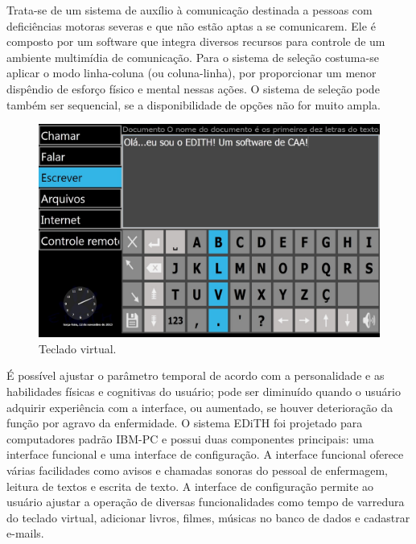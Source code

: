 \documentclass[twoside]{article}
\begin{document}
\begin{multicols}{2}
Trata-se de um sistema de auxílio à comunicação destinada a pessoas com deficiências motoras severas e que não estão aptas a se comunicarem. Ele é composto por um software que integra diversos recursos para controle de um ambiente multimídia de comunicação. Para o sistema de seleção costuma-se aplicar o modo linha-coluna (ou coluna-linha), por proporcionar um menor dispêndio de esforço físico e mental nessas ações. O sistema de seleção pode também ser sequencial, se a disponibilidade de opções não for muito ampla. 

\begin{figure}[H]
\label{fig:edith_tecladovirtual}
  \caption{Teclado virtual.}
  \centering
    \includegraphics[scale = 0.18]{edith_tecladovirtual.png}
\end{figure}

É possível ajustar o parâmetro temporal de acordo com a personalidade e as habilidades físicas e cognitivas do usuário; pode ser diminuído quando o usuário adquirir experiência com a interface, ou aumentado, se houver deterioração da função por agravo da enfermidade. O sistema EDiTH foi projetado para computadores padrão IBM-PC e possui duas componentes principais: uma interface funcional e uma interface de configuração. A interface funcional oferece várias facilidades como avisos e chamadas sonoras do pessoal de enfermagem, leitura de textos e escrita de texto. A interface de configuração permite ao usuário ajustar a operação de diversas funcionalidades como tempo de varredura do teclado virtual, adicionar livros, filmes, músicas no banco de dados e cadastrar e-mails.


\end{multicols}
\end{document}
